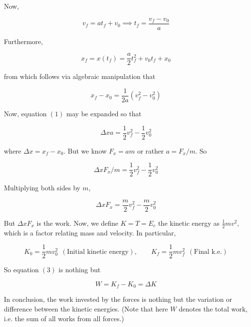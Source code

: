 \documentclass[12pt]{article}
\theoremstyle{definition}
\begin{document}
Now, 

\begin{equation*}
    v_f = at_f + v_0 \implies t_f = \frac{v_f - v_0}{a} 
\end{equation*}

Furthermore, 

\begin{equation*}
    x_f = x(t_f) = \frac{a}{2} t_f^2 + v_0 t_f + x_0
\end{equation*}

from which follows via algebraic manipulation that 

\begin{equation}
    x_f - x_0 = \frac{1}{2a}(v_f^2 - v_0^2)
\end{equation}

Now, equation $(1)$ may be expanded so that 

\begin{equation*}
    \Delta x a = \frac{1}{2}v_f^2 - \frac{1}{2}v_0^2
\end{equation*}

where $\Delta x = x_f - x_0$. But we know $F_x = am$ or rather $a = F_x / m$. So 

\begin{equation}
    \Delta x F_x / m = \frac{1}{2}v^2_f - \frac{1}{2}v_0^2
\end{equation}

Multiplying both sides by $m$, 

\begin{equation}
    \Delta x F_x = \frac{m}{2}v_f^2 - \frac{m}{2}v_0^2
\end{equation}

But $\Delta x F_x$ is the work. Now, we define $K = T = E_c$ the kinetic energy
as $\frac{1}{2}mv^2$, which is a factor relating mass and velocity. In
particular, 

\begin{equation*}
    K_0 = \frac{1}{2}mv_0^2 ~ ~ \left( \text{Initial kinetic energy} \right), \qquad
    K_f = \frac{1}{2}m v_f^2 ~ ~ (\text{Final k.e.})
\end{equation*}

So equation $(3)$ is nothing but 

\begin{equation}
    W = K_f - K_0 = \Delta K
\end{equation}

In conclusion, the work invested by the forces is nothing but the variation or
difference between the kinetic energies. (Note that here $W$ denotes  the total
work, i.e. the sum of all works from all forces.)
\end{document}
